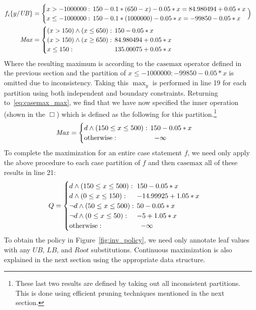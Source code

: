\documentclass[twoside,11pt]{article}
\newcommand{\casemax}{\mathrm{casemax}}
\newcommand{\UB}{\mathit{UB}}
\newcommand{\LB}{\mathit{LB}}
\newcommand{\Root}{\mathit{Root}}
\newcommand{\Max}{\mathit{Max}}
\newcommand{\sqm}{\hspace{-2mm}}
\begin{document}
\begin{enumerate}
{\begin{align*}
 f_i \{ y / \UB \} &= \begin{cases}
x > -1000000:    & \sqm 150 - 0.1 * (650 -x) - 0.05 * x = 84.980494 + 0.05 * x \\ 
x \leq -1000000: & \sqm 150 - 0.1 * (1000000) - 0.05 * x =  -99850 -0.05 * x\\ 
\end{cases} \Big) 
\\
\Max & = 
\begin{cases}
(x > 150) \land (x \leq 650):    & \sqm 150 - 0.05 * x \\ 
(x > 150) \land (x \geq 650):    & \sqm 84.980494 + 0.05 * x \\ 
x \leq 150: & \sqm 135.00075 + 0.05 * x\\ 
\end{cases}
\end{align*}}
Where the resulting maximum is according to the $\casemax$ operator defined in the previous section and the partition of $x \leq -1000000:  -99850 -0.05 * x$ is omitted due to inconsistency. Taking this $\max_y$ is performed in line 19 for each partition using both independent and boundary constraints. Returning to~\eqref{eq:casemax_max}, we find that we have now specified the inner operation (shown in the $\Box$) which is defined as the following for this partition.\footnote{ These last two results are defined by taking out all inconsistent partitions. This is done using efficient pruning techniques mentioned in the next section.}
\begin{align*}
\Max & = 
\begin{cases}
d \land (150 \leq x \leq 500):    & \sqm 150 - 0.05 * x \\ 
\text{\normalsize otherwise} : & -\infty\\ 
\end{cases}
\end{align*}
To complete the maximization for an entire case statement $f$, we need only apply the above procedure to each case partition of $f$ and then $\casemax$ all of these results in line 21: 
\begin{align*}
Q & = 
\begin{cases}
d \land (150 \leq x \leq 500):    & \sqm 150 - 0.05 * x \\ 
d \land (0 \leq x \leq 150):    & \sqm -14.99925 + 1.05 * x \\ 
\neg d \land (50 \leq x \leq 500):    & \sqm 50 - 0.05 * x \\ 
\neg d \land (0 \leq x \leq 50):    & \sqm -5 + 1.05 * x \\ 
\text{\normalsize otherwise} : & -\infty\\ 
\end{cases}
\end{align*}
To obtain the policy in Figure~\ref{fig:inv_policy}, 
we need only annotate leaf values with any 
$\UB$, $\LB$, and $\Root$ substitutions.
Continuous maximization is also	 explained in the next section using the appropriate data structure. 


\end{enumerate}
\end{document}
